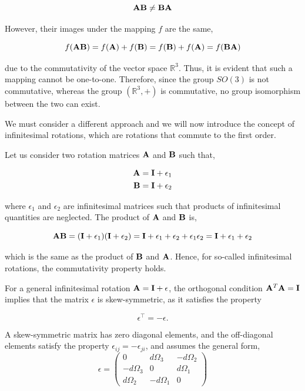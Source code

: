 \documentclass[12pt]{article}
\begin{document}
\[
  \vb{A}\vb{B} \neq \vb{B}\vb{A}
\]

However, their images under the mapping $f$ are the same,

\[
  f(\vb{A}\vb{B}) = f(\vb{A}) + f(\vb{B}) = f(\vb{B}) + f(\vb{A}) = f(\vb{B}\vb{A})
\]

due to the commutativity of the vector space $\mathbb{R}^3$. Thus, it is evident that such a
mapping cannot be one-to-one. Therefore, since the group $SO(3)$ is not commutative, whereas the group
$(\mathbb{R}^3,+)$ is commutative, no group isomorphism between the two can exist. \par


We must consider a different approach and we will now introduce the concept of infinitesimal
rotations, which are rotations that commute to the first order.

Let us consider two rotation matrices $\vb{A}$ and $\vb{B}$ such that,

\begin{align}
  \vb{A} &= \vb{I} + \epsilon_1 \\
  \vb{B} &= \vb{I} + \epsilon_2
\end{align}

where $\epsilon_1$ and $\epsilon_2$ are infinitesimal matrices such that
products of infinitesimal quantities are neglected. The product of $\vb{A}$ and $\vb{B}$
is,

\[
  \vb{A}\vb{B} = (\vb{I}+\epsilon_1)(\vb{I}+\epsilon_2) = \vb{I} + \epsilon_1 + \epsilon_2 + \epsilon_1\epsilon_2 = \vb{I} + \epsilon_1 + \epsilon_2
\]

which is the same as the product of $\vb{B}$ and $\vb{A}$. Hence, for so-called infinitesimal
rotations, the commutativity property holds.

For a general infinitesimal rotation $\vb{A} = \vb{I} + \epsilon$, the orthogonal condition
$\vb{A}^T\vb{A} = \vb{I}$ implies that the matrix $\epsilon$ is skew-symmetric, as it
satisfies the property

\[
  \epsilon^\top = -\epsilon.
\]

A skew-symmetric matrix has zero diagonal elements, and the off-diagonal elements satisfy the
property $\epsilon_{ij} = -\epsilon_{ji}$, and assumes the general form,
\[
  \epsilon =
  \begin{pmatrix}
    0           &  d\Omega_3 & -d\Omega_2 \\
    -d\Omega_3  &  0         &  d\Omega_1 \\
    d\Omega_2   & -d\Omega_1 &  0
  \end{pmatrix}
\]
\end{document}
